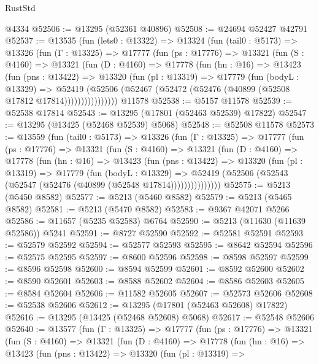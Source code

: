 \begin{lexlean}{RustStd}
\begin{coremodule}
    @4334
@52506 := @13295 (@52361 @40896)
@52508 := @24694 @52427 @42791
@52537 := @13535
    (fun (lets0 : @13322) =>
    @13324
      (fun (tail0 : @5173) =>
      @13326
        (fun (Γ : @13325) =>
        @17777
          (fun (ps : @17776) =>
          @13321
            (fun (S : @4160) =>
            @13321
              (fun (D : @4160) =>
              @17778
                (fun (hn : @16) =>
                @13423
                  (fun (pns : @13422) =>
                  @13320
                    (fun (pl : @13319) =>
                    @17779
                      (fun (bodyL : @13329) =>
                      @52419
                        (@52506
                          (@52467 (@52472 (@52476 (@40899 (@52508 @17812 @17814))))))))))))))))
    @11578
@52538 := @5157 @11578
@52539 := @52538 @17814
@52543 := @13295 (@17801 (@52463 @52539) @17822)
@52547 := @13295 (@13425 (@52468 @52539) @5068)
@52548 := @52508 @11578
@52573 := @13559
    (fun (tail0 : @5173) =>
    @13326
      (fun (Γ : @13325) =>
      @17777
        (fun (ps : @17776) =>
        @13321
          (fun (S : @4160) =>
          @13321
            (fun (D : @4160) =>
            @17778
              (fun (hn : @16) =>
              @13423
                (fun (pns : @13422) =>
                @13320
                  (fun (pl : @13319) =>
                  @17779
                    (fun (bodyL : @13329) =>
                    @52419 (@52506 (@52543 (@52547 (@52476 (@40899 (@52548 @17814)))))))))))))))
@52575 := @5213 (@5450 @8582)
@52577 := @5213 (@5460 @8582)
@52579 := @5213 (@5465 @8582)
@52581 := @5213 (@5470 @8582)
@52583 := @9367 @42071 @5266
@52586 := @11657 (@5235 @52583) @6764
@52590 := @5213 (@11630 (@11639 @52586)) @5241
@52591 := @8727 @52590
@52592 := @52581 @52591
@52593 := @52579 @52592
@52594 := @52577 @52593
@52595 := @8642 @52594
@52596 := @52575 @52595
@52597 := @8600 @52596
@52598 := @8598 @52597
@52599 := @8596 @52598
@52600 := @8594 @52599
@52601 := @8592 @52600
@52602 := @8590 @52601
@52603 := @8588 @52602
@52604 := @8586 @52603
@52605 := @8584 @52604
@52606 := @11582 @52605
@52607 := @52573 @52606
@52608 := @52538 @52606
@52612 := @13295 (@17801 (@52463 @52608) @17822)
@52616 := @13295 (@13425 (@52468 @52608) @5068)
@52617 := @52548 @52606
@52640 := @13577
    (fun (Γ : @13325) =>
    @17777
      (fun (ps : @17776) =>
      @13321
        (fun (S : @4160) =>
        @13321
          (fun (D : @4160) =>
          @17778
            (fun (hn : @16) =>
            @13423
              (fun (pns : @13422) =>
              @13320
                (fun (pl : @13319) =>

\end{coremodule}
\end{lexlean}

